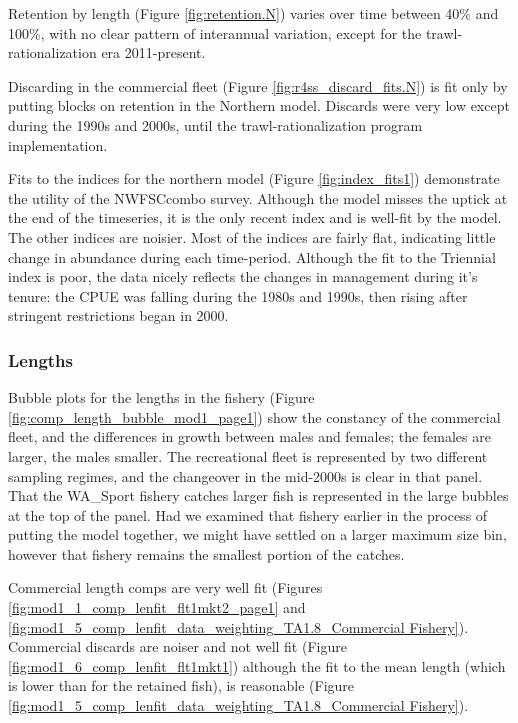 \documentclass[12pt,]{article}
\begin{document}
Retention by length (Figure \ref{fig:retention.N}) varies over time
between 40\% and 100\%, with no clear pattern of interannual variation,
except for the trawl-rationalization era 2011-present.

Discarding in the commercial fleet (Figure
\ref{fig:r4ss_discard_fits.N}) is fit only by putting blocks on
retention in the Northern model. Discards were very low except during
the 1990s and 2000s, until the trawl-rationalization program
implementation.

Fits to the indices for the northern model (Figure
\ref{fig:index_fits1}) demonstrate the utility of the NWFSCcombo survey.
Although the model misses the uptick at the end of the timeseries, it is
the only recent index and is well-fit by the model. The other indices
are noisier. Most of the indices are fairly flat, indicating little
change in abundance during each time-period. Although the fit to the
Triennial index is poor, the data nicely reflects the changes in
management during it's tenure: the CPUE was falling during the 1980s and
1990s, then rising after stringent restrictions began in 2000.

\subsubsection{Lengths}\label{lengths}

Bubble plots for the lengths in the fishery (Figure
\ref{fig:comp_length_bubble_mod1_page1}) show the constancy of the
commercial fleet, and the differences in growth between males and
females; the females are larger, the males smaller. The recreational
fleet is represented by two different sampling regimes, and the
changeover in the mid-2000s is clear in that panel. That the WA\_Sport
fishery catches larger fish is represented in the large bubbles at the
top of the panel. Had we examined that fishery earlier in the process of
putting the model together, we might have settled on a larger maximum
size bin, however that fishery remains the smallest portion of the
catches.

Commercial length comps are very well fit (Figures
\ref{fig:mod1_1_comp_lenfit_flt1mkt2_page1} and
\ref{fig:mod1_5_comp_lenfit_data_weighting_TA1.8_Commercial Fishery}).
Commercial discards are noiser and not well fit (Figure
\ref{fig:mod1_6_comp_lenfit_flt1mkt1}) although the fit to the mean
length (which is lower than for the retained fish), is reasonable
(Figure
\ref{fig:mod1_5_comp_lenfit_data_weighting_TA1.8_Commercial Fishery}).
\end{document}
